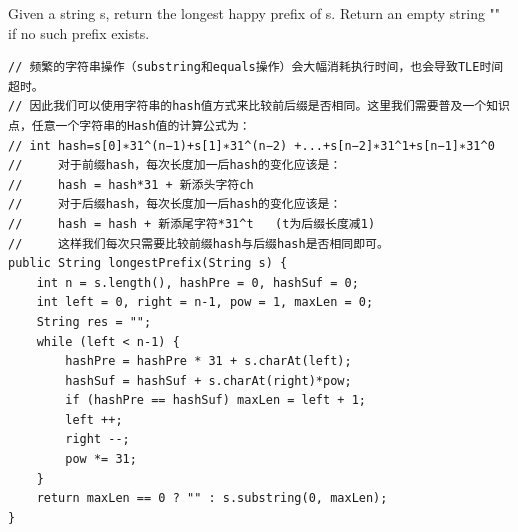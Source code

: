 \documentclass[9pt, b5paaper]{book}
\begin{document}
Given a string s, return the longest happy prefix of s. Return an empty string "" if no such prefix exists.
\begin{verbatim}
// 频繁的字符串操作（substring和equals操作）会大幅消耗执行时间，也会导致TLE时间超时。
// 因此我们可以使用字符串的hash值方式来比较前后缀是否相同。这里我们需要普及一个知识点，任意一个字符串的Hash值的计算公式为：
// int hash=s[0]∗31^(n−1)+s[1]∗31^(n−2) +...+s[n−2]∗31^1+s[n−1]∗31^0
//     对于前缀hash，每次长度加一后hash的变化应该是：
//     hash = hash*31 + 新添头字符ch
//     对于后缀hash，每次长度加一后hash的变化应该是：
//     hash = hash + 新添尾字符*31^t   (t为后缀长度减1)
//     这样我们每次只需要比较前缀hash与后缀hash是否相同即可。
public String longestPrefix(String s) {
    int n = s.length(), hashPre = 0, hashSuf = 0;
    int left = 0, right = n-1, pow = 1, maxLen = 0;
    String res = "";
    while (left < n-1) {
        hashPre = hashPre * 31 + s.charAt(left);
        hashSuf = hashSuf + s.charAt(right)*pow;
        if (hashPre == hashSuf) maxLen = left + 1;
        left ++;
        right --;
        pow *= 31;
    }
    return maxLen == 0 ? "" : s.substring(0, maxLen);
}
\end{verbatim}
\end{document}
